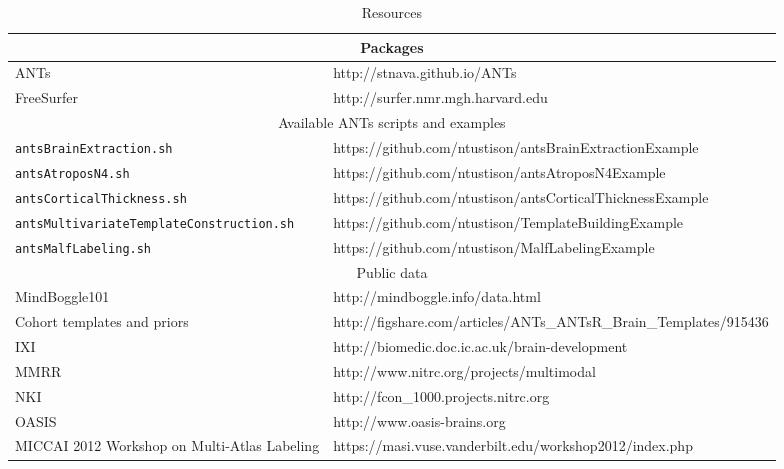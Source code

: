 \begin{table*}
\caption{Resources}
\label{table:resources}
\centering
\begin{tabular*}{0.95\textwidth}{@{\extracolsep{\fill}} l l}
\toprule
\multicolumn{2}{c}{Packages} \\
\midrule
ANTs & http://stnava.github.io/ANTs \\
FreeSurfer & http://surfer.nmr.mgh.harvard.edu  \\
\midrule
\multicolumn{2}{c}{Available ANTs scripts and examples} \\
\midrule
{\tt antsBrainExtraction.sh} & https://github.com/ntustison/antsBrainExtractionExample  \\
{\tt antsAtroposN4.sh} & https://github.com/ntustison/antsAtroposN4Example  \\
{\tt antsCorticalThickness.sh} & https://github.com/ntustison/antsCorticalThicknessExample  \\
{\tt antsMultivariateTemplateConstruction.sh} & https://github.com/ntustison/TemplateBuildingExample  \\
{\tt antsMalfLabeling.sh} & https://github.com/ntustison/MalfLabelingExample  \\
\midrule
\multicolumn{2}{c}{Public data} \\
\midrule
MindBoggle101 & http://mindboggle.info/data.html  \\
Cohort templates and priors & http://figshare.com/articles/ANTs\_ANTsR\_Brain\_Templates/915436 \\
IXI & http://biomedic.doc.ic.ac.uk/brain-development \\
MMRR & http://www.nitrc.org/projects/multimodal \\
NKI & http://fcon\_1000.projects.nitrc.org \\
OASIS & http://www.oasis-brains.org \\
MICCAI 2012 Workshop on Multi-Atlas Labeling & https://masi.vuse.vanderbilt.edu/workshop2012/index.php \\
\bottomrule
\end{tabular*}
\end{table*}
